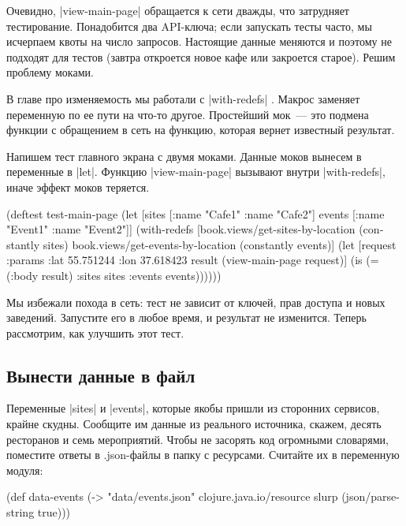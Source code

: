 Очевидно, \spverb|view-main-page| обращается к сети дважды, что затрудняет
тестирование. Понадобится два API-ключа; если запускать тесты часто, мы
исчерпаем квоты на число запросов. Настоящие данные меняются и поэтому не
подходят для тестов (завтра откроется новое кафе или закроется старое). Решим
проблему моками.

В главе про изменяемость мы работали с \spverb|with-redefs| .
Макрос заменяет переменную по ее пути на что-то другое. Простейший мок~--- это
подмена функции с обращением в сеть на функцию, которая вернет известный
результат.

Напишем тест главного экрана с двумя моками. Данные моков вынесем в переменные в
\spverb|let|. Функцию \spverb|view-main-page| вызывают внутри
\spverb|with-redefs|, иначе эффект моков теряется.

\begin{english}
  \begin{clojure}
(deftest test-main-page
  (let [sites [{:name "Cafe1"} {:name "Cafe2"}]
        events [{:name "Event1"} {:name "Event2"}]]
    (with-redefs
      [book.views/get-sites-by-location (constantly sites)
       book.views/get-events-by-location (constantly events)]
      (let [request {:params {:lat 55.751244
                              :lon 37.618423}}
            result (view-main-page request)]
        (is (= (:body result)
               {:sites sites :events events}))))))
  \end{clojure}
\end{english}

Мы избежали похода в сеть: тест не зависит от ключей, прав доступа и новых
заведений. Запустите его в любое время, и результат не изменится. Теперь
рассмотрим, как улучшить этот тест.

\subsection{Вынести данные в файл}

Переменные \spverb|sites| и \spverb|events|, которые якобы пришли из сторонних
сервисов, крайне скудны. Сообщите им данные из реального источника, скажем,
десять ресторанов и семь мероприятий. Чтобы не засорять код огромными словарями,
поместите ответы в .json-файлы в папку с ресурсами. Считайте их в переменную
модуля:

\begin{english}
  \begin{clojure}
(def data-events
  (-> "data/events.json"
      clojure.java.io/resource
      slurp
      (json/parse-string true)))
  \end{clojure}
\end{english}

